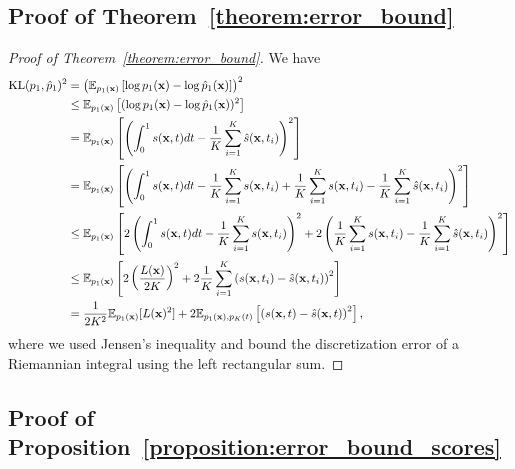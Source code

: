 \subsection{Proof of Theorem~\ref{theorem:error_bound}}

\begin{proof}[Proof of Theorem~\ref{theorem:error_bound}]

We have
\begin{align}
    \mathrm{KL}(p_1, \hat{p}_1)^2
    &= 
    \left(
    \mathbb{E}_{p_1(\operatorname{\mathbf{x}})} \left[
    \log p_1(\operatorname{\mathbf{x}}) - \log \hat{p}_1(\operatorname{\mathbf{x}})
    \right]
    \right)^2
    \\
    &\leq
    \mathbb{E}_{p_1(\operatorname{\mathbf{x}})} \left[
    (\log p_1(\operatorname{\mathbf{x}}) - \log \hat{p}_1(\operatorname{\mathbf{x}}))^2
    \right]
    \\
    &=
    \mathbb{E}_{p_1(\operatorname{\mathbf{x}})} \left[
    \left(
    \int_0^1 s(\operatorname{\mathbf{x}}, t)dt - 
    \frac{1}{K}\sum_{i=1}^K \hat{s}(\operatorname{\mathbf{x}}, t_i)
    \right)^2
    \right]
    \\
    &=
    \mathbb{E}_{p_1(\operatorname{\mathbf{x}})} \left[
    \left(
    \int_0^1 s(\operatorname{\mathbf{x}}, t)dt - 
    \frac{1}{K}\sum_{i=1}^K s(\operatorname{\mathbf{x}}, t_i)
    +
    \frac{1}{K}\sum_{i=1}^K s(\operatorname{\mathbf{x}}, t_i)
    -
    \frac{1}{K}\sum_{i=1}^K \hat{s}(\operatorname{\mathbf{x}}, t_i)
    \right)^2
    \right]
    \\
    &\leq
    \mathbb{E}_{p_1(\operatorname{\mathbf{x}})} \left[
    2
    \left(
    \int_0^1 s(\operatorname{\mathbf{x}}, t)dt 
    - 
    \frac{1}{K}\sum_{i=1}^K s(\operatorname{\mathbf{x}}, t_i)
    \right)^2
    +
    2
    \left(
    \frac{1}{K}\sum_{i=1}^K s(\operatorname{\mathbf{x}}, t_i)
    -
    \frac{1}{K}\sum_{i=1}^K \hat{s}(\operatorname{\mathbf{x}}, t_i)
    \right)^2
    \right]
    \\
    &\leq
    \mathbb{E}_{p_1(\operatorname{\mathbf{x}})} \left[
    2
    \left(
    \frac{L(\operatorname{\mathbf{x}})}{2K}
    \right)^2
    +
    2
    \frac{1}{K}\sum_{i=1}^K \left( 
    s(\operatorname{\mathbf{x}}, t_i) - \hat{s}(\operatorname{\mathbf{x}}, t_i)
    \right)^2
    \right]
    \\
    &=
    \frac{1}{2K^2}\mathbb{E}_{p_1(\operatorname{\mathbf{x}})}[L(\operatorname{\mathbf{x}})^2]
    +
    2
    \mathbb{E}_{p_1(\operatorname{\mathbf{x}}), p_K(t)} \left[
    \left(
    s(\operatorname{\mathbf{x}}, t) - \hat{s}(\operatorname{\mathbf{x}}, t)
    \right)^2
    \right],
\end{align}
where we used Jensen's inequality and bound the discretization error of a Riemannian integral using the left rectangular sum.

\end{proof}


\subsection{Proof of Proposition~\ref{proposition:error_bound_scores}}

